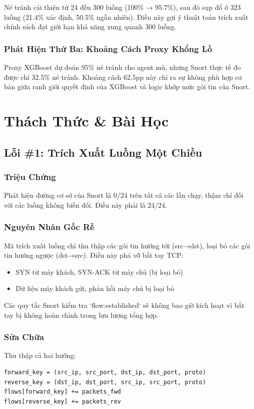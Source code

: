 \documentclass[12pt,a4paper]{report}
\begin{document}
Né tránh cải thiện từ 24 đến 300 luồng (100\% → 95.7\%), sau đó sụp đổ ở 323 luồng (21.4\% xác định, 50.5\% ngẫu nhiên). Điều này gợi ý thuật toán trích xuất chính sách đạt giới hạn khả năng xung quanh 300 luồng.

\subsection{Phát Hiện Thứ Ba: Khoảng Cách Proxy Khổng Lồ}

Proxy XGBoost dự đoán 95\% né tránh cho agent mù, nhưng Snort thực tế đo được chỉ 32.5\% né tránh. Khoảng cách 62.5pp này chỉ ra sự không phù hợp cơ bản giữa ranh giới quyết định của XGBoost và logic khớp mức gói tin của Snort.

\chapter{Thách Thức \& Bài Học}

\section{Lỗi \#1: Trích Xuất Luồng Một Chiều}

\subsection{Triệu Chứng}
Phát hiện đường cơ sở của Snort là 0/24 trên tất cả các lần chạy, thậm chí đối với các luồng không biến đổi. Điều này phải là 24/24.

\subsection{Nguyên Nhân Gốc Rễ}
Mã trích xuất luồng chỉ thu thập các gói tin hướng tới (src→dst), loại bỏ các gói tin hướng ngược (dst→src). Điều này phá vỡ bắt tay TCP:
\begin{itemize}
  \item SYN từ máy khách, SYN-ACK từ máy chủ (bị loại bỏ)
  \item Dữ liệu máy khách gửi, phản hồi máy chủ bị loại bỏ
\end{itemize}
Các quy tắc Snort kiểm tra `flow:established` sẽ không bao giờ kích hoạt vì bắt tay bị không hoàn chỉnh trong lưu lượng tổng hợp.

\subsection{Sửa Chữa}
Thu thập cả hai hướng:
\begin{verbatim}
forward_key = (src_ip, src_port, dst_ip, dst_port, proto)
reverse_key = (dst_ip, dst_port, src_ip, src_port, proto)
flows[forward_key] += packets_fwd
flows[reverse_key] += packets_rev
\end{verbatim}
\end{document}
